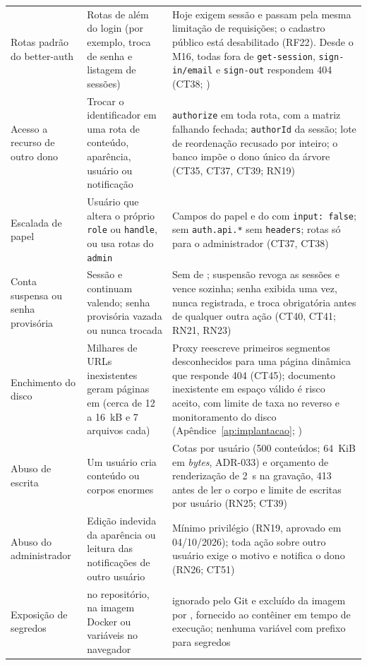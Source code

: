 \begin{longtable}{@{}L{3.3cm}L{4.4cm}L{5.4cm}@{}}
Rotas padrão do better-auth & Rotas de  além do login (por exemplo, troca de senha e listagem de sessões) & Hoje exigem sessão e passam pela mesma limitação de requisições; o cadastro público está desabilitado (RF22). Desde o M16, todas fora de \texttt{get-session}, \texttt{sign-in/email} e \texttt{sign-out} respondem 404 (CT38; )\\[1pt]
Acesso a recurso de outro dono & Trocar o identificador em uma rota de conteúdo, aparência, usuário ou notificação & \texttt{authorize} em toda rota, com a matriz falhando fechada; \texttt{authorId} da sessão; lote de reordenação recusado por inteiro; o banco impõe o dono único da árvore (CT35, CT37, CT39; RN19)\\[1pt]
Escalada de papel & Usuário que altera o próprio \texttt{role} ou \texttt{handle}, ou usa rotas do  \texttt{admin} & Campos do papel e do  com \texttt{input: false}; sem \texttt{auth.api.*} sem \texttt{headers}; rotas  só para o administrador (CT37, CT38)\\[1pt]
Conta suspensa ou senha provisória & Sessão e  continuam valendo; senha provisória vazada ou nunca trocada & Sem  de ; suspensão revoga as sessões e vence sozinha; senha exibida uma vez, nunca registrada, e troca obrigatória antes de qualquer outra ação (CT40, CT41; RN21, RN23)\\[1pt]
Enchimento do disco & Milhares de URLs inexistentes geram páginas em  (cerca de 12 a 16~kB e 7 arquivos cada) & Proxy reescreve primeiros segmentos desconhecidos para uma página dinâmica que responde 404 (CT45); documento inexistente em espaço válido é risco aceito, com limite de taxa no  reverso e monitoramento do disco (Apêndice~\ref{ap:implantacao}; )\\[1pt]
Abuso de escrita & Um usuário cria conteúdo ou corpos enormes & Cotas por usuário (500 conteúdos; 64~KiB em \emph{bytes}, ADR-033) e orçamento de renderização de 2~s na gravação, 413 antes de ler o corpo e limite de escritas por usuário (RN25; CT39)\\[1pt]
Abuso do administrador & Edição indevida da aparência ou leitura das notificações de outro usuário & Mínimo privilégio (RN19, aprovado em 04/10/2026); toda ação sobre outro usuário exige o motivo e notifica o dono (RN26; CT51)\\[1pt]
Exposição de segredos &  no repositório, na imagem Docker ou variáveis no navegador &  ignorado pelo Git e excluído da imagem por , fornecido ao contêiner em tempo de execução; nenhuma variável com prefixo  para segredos\\[1pt]

\end{longtable}

